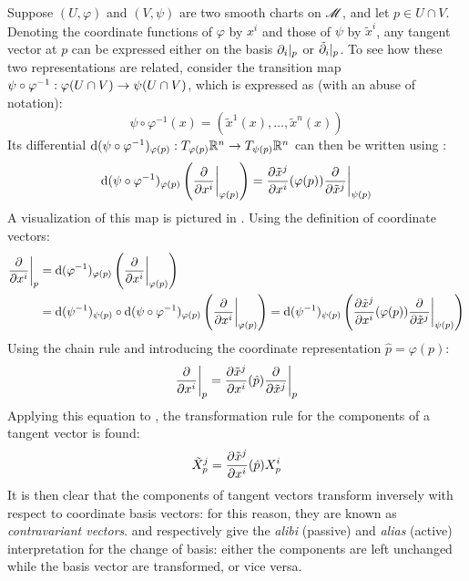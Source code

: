 Suppose $ (U,\varphi) $ and $ (V,\psi) $ are two smooth charts on $ \mathscr{M} $, and let $ p \in U \cap V $. Denoting the coordinate functions of $ \varphi $ by $ x^i $ and those of $ \psi $ by $ \tilde{x}^i $, any tangent vector at $ p $ can be expressed either on the basis $ \partial_i\vert_p $ or $ \tilde{\partial}_i\vert_p $. To see how these two representations are related, consider the transition map $ \psi \circ \varphi^{-1} : \varphi(U \cap V) \rightarrow \psi(U \cap V) $, which is expressed as (with an abuse of notation):
\begin{equation*}
  \psi \circ \varphi^{-1} (x) = (\tilde{x}^1(x) , \dots , \tilde{x}^n(x))
\end{equation*}
Its differential $ \mathrm{d} (\psi \circ \varphi^{-1})_{\varphi(p)} : T_{\varphi(p)}\mathbb{R}^n \rightarrow T_{\psi(p)}\mathbb{R}^n $ can then be written using :
\begin{equation*}
  \mathrm{d} (\psi \circ \varphi^{-1})_{\varphi(p)} \left( \frac{\partial}{\partial x^i} \bigg\vert_{\varphi(p)} \right) = \frac{\partial \tilde{x}^j}{\partial x^i}(\varphi(p)) \frac{\partial}{\partial \tilde{x}^j} \bigg\vert_{\psi(p)}
\end{equation*}
A visualization of this map is pictured in . Using the definition of coordinate vectors:
\begin{equation*}
  \begin{split}
    \frac{\partial}{\partial x^i} \bigg\vert_p
    & = \mathrm{d} (\varphi^{-1})_{\varphi(p)} \left( \frac{\partial}{\partial x^i} \bigg\vert_{\varphi(p)} \right) \\
    & = \mathrm{d} (\psi^{-1})_{\psi(p)} \circ \mathrm{d} (\psi \circ \varphi^{-1})_{\varphi(p)} \left( \frac{\partial}{\partial x^i} \bigg\vert_{\varphi(p)} \right)=  \mathrm{d} (\psi^{-1})_{\psi(p)} \left( \frac{\partial \tilde{x}^j}{\partial x^i}(\varphi(p)) \frac{\partial}{\partial \tilde{x}^j} \bigg\vert_{\psi(p)} \right)
  \end{split}
\end{equation*}
Using the chain rule and introducing the coordinate representation $ \hat{p} = \varphi(p) $:
\begin{equation}
  \frac{\partial}{\partial x^i} \bigg\vert_p = \frac{\partial \tilde{x}^j}{\partial x^i}(\hat{p}) \frac{\partial}{\partial \tilde{x}^j} \bigg\vert_p
  \label{eq:contravariant-alibi}
\end{equation}
Applying this equation to , the transformation rule for the components of a tangent vector is found:
\begin{equation}
  \tilde{X}_p^j = \frac{\partial \tilde{x}^j}{\partial x^i}(\hat{p}) X_p^i
  \label{eq:contravariant-alias}
\end{equation}
It is then clear that the components of tangent vectors transform inversely with respect to coordinate basis vectors: for this reason, they are known as \emph{contravariant vectors}.  and  respectively give the \emph{alibi} (passive) and \emph{alias} (active) interpretation for the change of basis: either the components are left unchanged while the basis vector are transformed, or vice versa.

